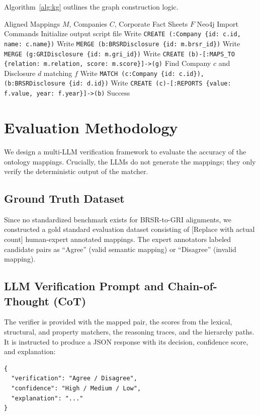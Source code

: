 \documentclass[journal,compsoc]{IEEEtran}
\begin{document}
\begin{itemize}
\begin{table}[t]
\begin{itemize}
Algorithm~\ref{alg:kg} outlines the graph construction logic.

\begin{algorithm}
\caption{ESG Knowledge Graph Construction}
\label{alg:kg}
\begin{algorithmic}[1]
\REQUIRE Aligned Mappings $M$, Companies $C$, Corporate Fact Sheets $F$
\ENSURE Neo4j Import Commands
\STATE Initialize output script file
    \STATE Write \texttt{CREATE (:Company \{id: c.id, name: c.name\})}
\ENDFOR
{}
    \STATE Write \texttt{MERGE (b:BRSRDisclosure \{id: m.brsr\_id\})}
    \STATE Write \texttt{MERGE (g:GRIDisclosure \{id: m.gri\_id\})}
    \STATE Write \texttt{CREATE (b)-[:MAPS\_TO \{relation: m.relation, score: m.score\}]->(g)}
\ENDFOR
{}
    \STATE Find Company $c$ and Disclosure $d$ matching $f$
    \STATE Write \texttt{MATCH (c:Company \{id: c.id\}), (b:BRSRDisclosure \{id: d.id\})}
    \STATE Write \texttt{CREATE (c)-[:REPORTS \{value: f.value, year: f.year\}]->(b)}
\ENDFOR
\RETURN Success
\end{algorithmic}
\end{algorithm}

\section{Evaluation Methodology}
We design a multi-LLM verification framework to evaluate the accuracy of the ontology mappings. Crucially, the LLMs do not generate the mappings; they only verify the deterministic output of the matcher.

\subsection{Ground Truth Dataset}
Since no standardized benchmark exists for BRSR-to-GRI alignments, we constructed a gold standard evaluation dataset consisting of [Replace with actual count] human-expert annotated mappings. The expert annotators labeled candidate pairs as ``Agree'' (valid semantic mapping) or ``Disagree'' (invalid mapping).

\subsection{LLM Verification Prompt and Chain-of-Thought (CoT)}
The verifier is provided with the mapped pair, the scores from the lexical, structural, and property matchers, the reasoning traces, and the hierarchy paths. It is instructed to produce a JSON response with its decision, confidence score, and explanation:
\begin{verbatim}
{
  "verification": "Agree / Disagree",
  "confidence": "High / Medium / Low",
  "explanation": "..."
}
\end{verbatim}


\end{itemize}
\end{table}
\end{itemize}
\end{document}
